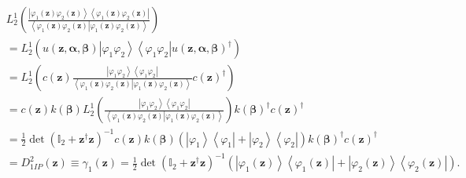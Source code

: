 \documentclass[aps,preprint]{revtex4}%
\begin{document}
\begin{align}
&  L_{2}^{1}\left(  \frac{\left\vert \varphi_{1}\left(  \mathbf{z}\right)
\varphi_{2}\left(  \mathbf{z}\right)  \right\rangle \left\langle \varphi
_{1}\left(  \mathbf{z}\right)  \varphi_{2}\left(  \mathbf{z}\right)
\right\vert }{\left\langle \varphi_{1}\left(  \mathbf{z}\right)  \varphi
_{2}\left(  \mathbf{z}\right)  \left\vert \varphi_{1}\left(  \mathbf{z}%
\right)  \varphi_{2}\left(  \mathbf{z}\right)  \right.  \right\rangle }\right)
\nonumber\\
&  =L_{2}^{1}\left(  u\left(  \mathbf{z,\alpha,\beta}\right)  \left\vert
\varphi_{1}\varphi_{2}\right\rangle \left\langle \varphi_{1}\varphi
_{2}\right\vert u\left(  \mathbf{z,\alpha,\beta}\right)  ^{\dagger}\right)
\nonumber\\
&  =L_{2}^{1}\left(  c\left(  \mathbf{z}\right)  \frac{\left\vert \varphi
_{1}\varphi_{2}\right\rangle \left\langle \varphi_{1}\varphi_{2}\right\vert
}{\left\langle \varphi_{1}\left(  \mathbf{z}\right)  \varphi_{2}\left(
\mathbf{z}\right)  \left\vert \varphi_{1}\left(  \mathbf{z}\right)
\varphi_{2}\left(  \mathbf{z}\right)  \right.  \right\rangle }c\left(
\mathbf{z}\right)  ^{\dagger}\right) \nonumber\\
&  =c\left(  \mathbf{z}\right)  k\left(  \mathbf{\beta}\right)  L_{2}%
^{1}\left(  \frac{\left\vert \varphi_{1}\varphi_{2}\right\rangle \left\langle
\varphi_{1}\varphi_{2}\right\vert }{\left\langle \varphi_{1}\left(
\mathbf{z}\right)  \varphi_{2}\left(  \mathbf{z}\right)  \left\vert
\varphi_{1}\left(  \mathbf{z}\right)  \varphi_{2}\left(  \mathbf{z}\right)
\right.  \right\rangle }\right)  k\left(  \mathbf{\beta}\right)  ^{\dagger
}c\left(  \mathbf{z}\right)  ^{\dagger}\nonumber\\
&  =\frac{1}{2}\det\left(  \mathbb{I}_{2}+\mathbf{z}^{\dagger}\mathbf{z}%
\right)  ^{-1}c\left(  \mathbf{z}\right)  k\left(  \mathbf{\beta}\right)
\left(  \left\vert \varphi_{1}\right\rangle \left\langle \varphi
_{1}\right\vert +\left\vert \varphi_{2}\right\rangle \left\langle \varphi
_{2}\right\vert \right)  k\left(  \mathbf{\beta}\right)  ^{\dagger}c\left(
\mathbf{z}\right)  ^{\dagger}\nonumber\\
&  =D_{1IP}^{2}\left(  \mathbf{z}\right)  \equiv\gamma_{1}\left(
\mathbf{z}\right)  =\frac{1}{2}\det\left(  \mathbb{I}_{2}+\mathbf{z}^{\dagger
}\mathbf{z}\right)  ^{-1}\left(  \left\vert \varphi_{1}\left(  \mathbf{z}%
\right)  \right\rangle \left\langle \varphi_{1}\left(  \mathbf{z}\right)
\right\vert +\left\vert \varphi_{2}\left(  \mathbf{z}\right)  \right\rangle
\left\langle \varphi_{2}\left(  \mathbf{z}\right)  \right\vert \right)  .
\end{align}
\end{document}
